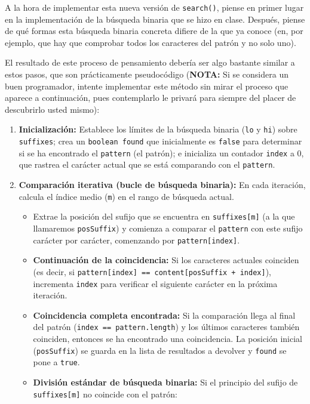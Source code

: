\documentclass[10pt,a4paper,spanish]{article}
\newcommand{\code}[1]{\texttt{#1}}
\begin{document}
A la hora de implementar esta nueva versión de \code{search()}, piense en primer lugar en la implementación de la búsqueda binaria que se hizo en clase. Después, piense de qué formas esta búsqueda binaria concreta difiere de la que ya conoce (en, por ejemplo, que hay que comprobar todos los caracteres del patrón y no solo uno).

El resultado de este proceso de pensamiento debería ser algo bastante similar a estos pasos, que son prácticamente pseudocódigo (\textbf{NOTA:} Si se considera un buen programador, intente implementar este método sin mirar el proceso que aparece a continuación, pues contemplarlo le privará para siempre del placer de descubrirlo usted mismo):

\begin{enumerate}
\item \textbf{Inicialización:} Establece los límites de la búsqueda binaria (\code{lo} y \code{hi}) sobre \code{suffixes}; crea un \code{boolean found} que inicialmente es \code{false}  para determinar si se ha encontrado el \code{pattern} (el patrón); e inicializa un contador \code{index} a 0, que rastrea el carácter actual que se está comparando con el \code{pattern}.
\item \textbf{Comparación iterativa (bucle de búsqueda binaria):} En cada iteración, calcula el índice medio (\code{m}) en el rango de búsqueda actual.
    \begin{itemize}
    \item Extrae la posición del sufijo que se encuentra en \code{suffixes[m]} (a la que llamaremos \code{posSuffix}) y comienza a comparar el \code{pattern} con este sufijo carácter por carácter, comenzando por \code{pattern[index]}.
    \item \textbf{Continuación de la coincidencia:} Si los caracteres actuales coinciden (es decir, si \code{pattern[index] == content[posSuffix + index]}), incrementa \code{index} para verificar el siguiente carácter en la próxima iteración.
    \item \textbf{Coincidencia completa encontrada:} Si la comparación llega al final del patrón (\code{index == pattern.length}) y los últimos caracteres también coinciden, entonces se ha encontrado una coincidencia. La posición inicial (\code{posSuffix}) se guarda en la lista de resultados a devolver y \code{found} se pone a \code{true}.
    \item \textbf{División estándar de búsqueda binaria:} Si el principio del sufijo de \code{suffixes[m]} no coincide con el patrón:
        \begin{itemize}

\end{itemize}
\end{itemize}
\end{enumerate}
\end{document}
